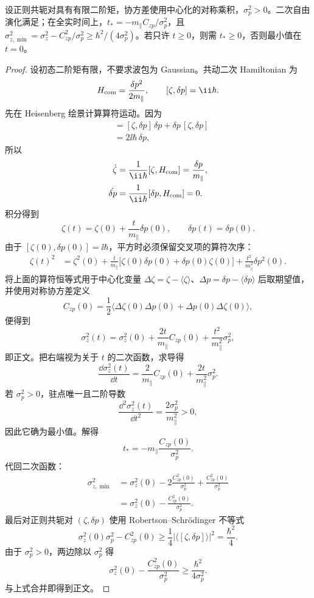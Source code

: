 \begin{proposition}[二次剪切的方差极小值]
设正则共轭对具有有限二阶矩，协方差使用中心化的对称乘积，$\sigma_p^2>0$。二次自由演化满足；在全实时间上，$t_*=-m_\parallel C_{zp}/\sigma_p^2$，且 $\sigma_{z,\min}^2=\sigma_z^2-C_{zp}^2/\sigma_p^2\ge\hbar^2/(4\sigma_p^2)$。若只许 $t\ge0$，则需 $t_*\ge0$，否则最小值在 $t=0$。
\end{proposition}
\begin{proof}
设初态二阶矩有限，不要求波包为 Gaussian。共动二次 Hamiltonian 为
\[
H_{\rm com}=\frac{\delta p^2}{2m_\parallel},
\qquad
[\zeta,\delta p]=\ii\hbar.
\]
先在 Heisenberg 绘景计算算符运动。因为
\begin{align*}
[\zeta,\delta p^2]
&=[\zeta,\delta p]\,\delta p
+\delta p\,[\zeta,\delta p]\\
&=2\ii\hbar\,\delta p,
\end{align*}
所以
\begin{align*}
\dot\zeta
&=\frac{1}{\ii\hbar}[\zeta,H_{\rm com}]
=\frac{\delta p}{m_\parallel},\\
\dot{\delta p}
&=\frac{1}{\ii\hbar}[\delta p,H_{\rm com}]=0.
\end{align*}
积分得到
\[
\zeta(t)=\zeta(0)+\frac{t}{m_\parallel}\delta p(0),
\qquad
\delta p(t)=\delta p(0).
\]
由于 $[\zeta(0),\delta p(0)]=\ii\hbar$，平方时必须保留交叉项的算符次序：
\begin{align*}
\zeta(t)^2
&=\zeta^2(0)
+\frac{t}{m_\parallel}
\bigl[\zeta(0)\delta p(0)+\delta p(0)\zeta(0)\bigr]
+\frac{t^2}{m_\parallel^2}\delta p^2(0).
\end{align*}
将上面的算符恒等式用于中心化变量 $\Delta\zeta=\zeta-\langle\zeta\rangle$、$\Delta p=\delta p-\langle\delta p\rangle$ 后取期望值，并使用对称协方差定义
\[
C_{zp}(0)=\frac12
\langle\Delta\zeta(0)\Delta p(0)+\Delta p(0)\Delta\zeta(0)\rangle,
\]
便得到
\[
\sigma_z^2(t)
=\sigma_z^2(0)
+\frac{2t}{m_\parallel}C_{zp}(0)
+\frac{t^2}{m_\parallel^2}\sigma_p^2,
\]
即正文。把右端视为关于 $t$ 的二次函数，求导得
\[
\frac{\dd\sigma_z^2(t)}{\dd t}
=\frac{2}{m_\parallel}C_{zp}(0)
+\frac{2t}{m_\parallel^2}\sigma_p^2.
\]
若 $\sigma_p^2>0$，驻点唯一且二阶导数
\[
\frac{\dd^2\sigma_z^2(t)}{\dd t^2}
=\frac{2\sigma_p^2}{m_\parallel^2}>0,
\]
因此它确为最小值。解得
\[
t_*=-m_\parallel\frac{C_{zp}(0)}{\sigma_p^2}.
\]
代回二次函数：
\begin{align*}
\sigma_{z,\min}^2
&=\sigma_z^2(0)
-2\frac{C_{zp}^2(0)}{\sigma_p^2}
+\frac{C_{zp}^2(0)}{\sigma_p^2}\\
&=\sigma_z^2(0)-\frac{C_{zp}^2(0)}{\sigma_p^2}.
\end{align*}
最后对正则共轭对 $(\zeta,\delta p)$ 使用 Robertson--Schr\"odinger 不等式
\[
\sigma_z^2(0)\sigma_p^2-C_{zp}^2(0)
\ge\frac14|\langle[\zeta,\delta p]\rangle|^2
=\frac{\hbar^2}{4}.
\]
由于 $\sigma_p^2>0$，两边除以 $\sigma_p^2$ 得
\[
\sigma_z^2(0)-\frac{C_{zp}^2(0)}{\sigma_p^2}
\ge\frac{\hbar^2}{4\sigma_p^2}.
\]
与上式合并即得到正文。
\end{proof}


